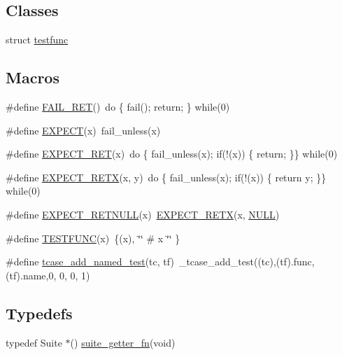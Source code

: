 \subsection*{Classes}
\begin{DoxyCompactItemize}
\item 
struct \hyperlink{structtestfunc}{testfunc}
\end{DoxyCompactItemize}
\subsection*{Macros}
\begin{DoxyCompactItemize}
\item 
\#define \hyperlink{openmote-cc2538_2lwip_2test_2unit_2lwip__check_8h_a6cdd9328a3d8ccf35c2044a2537ed188}{F\+A\+I\+L\+\_\+\+R\+ET}()~do \{ fail(); return; \} while(0)
\item 
\#define \hyperlink{openmote-cc2538_2lwip_2test_2unit_2lwip__check_8h_a8939fc832773dcf2c81b93d8bbf88603}{E\+X\+P\+E\+CT}(x)~fail\+\_\+unless(x)
\item 
\#define \hyperlink{openmote-cc2538_2lwip_2test_2unit_2lwip__check_8h_acf563e698c9e212be6e0506cc178964e}{E\+X\+P\+E\+C\+T\+\_\+\+R\+ET}(x)~do \{ fail\+\_\+unless(x); if(!(x)) \{ return; \}\} while(0)
\item 
\#define \hyperlink{openmote-cc2538_2lwip_2test_2unit_2lwip__check_8h_a61ba45af020516f53b9e9af7b066574e}{E\+X\+P\+E\+C\+T\+\_\+\+R\+E\+TX}(x,  y)~do \{ fail\+\_\+unless(x); if(!(x)) \{ return y; \}\} while(0)
\item 
\#define \hyperlink{openmote-cc2538_2lwip_2test_2unit_2lwip__check_8h_a937ec9da8ce7532d592ef5216e4173cd}{E\+X\+P\+E\+C\+T\+\_\+\+R\+E\+T\+N\+U\+LL}(x)~\hyperlink{openmote-cc2538_2lwip_2test_2unit_2lwip__check_8h_a61ba45af020516f53b9e9af7b066574e}{E\+X\+P\+E\+C\+T\+\_\+\+R\+E\+TX}(x, \hyperlink{openmote-cc2538_2lwip_2src_2include_2lwip_2def_8h_a070d2ce7b6bb7e5c05602aa8c308d0c4}{N\+U\+LL})
\item 
\#define \hyperlink{openmote-cc2538_2lwip_2test_2unit_2lwip__check_8h_ace3c4951143e45f20117e149d82f5a0b}{T\+E\+S\+T\+F\+U\+NC}(x)~\{(x), \char`\"{}\char`\"{} \# x \char`\"{}\char`\"{} \}
\item 
\#define \hyperlink{openmote-cc2538_2lwip_2test_2unit_2lwip__check_8h_a7bd4b6b9688f47b14fdc5b5ca6bd97fa}{tcase\+\_\+add\+\_\+named\+\_\+test}(tc,  tf)~\+\_\+tcase\+\_\+add\+\_\+test((tc),(tf).func,(tf).name,0, 0, 0, 1)
\end{DoxyCompactItemize}
\subsection*{Typedefs}
\begin{DoxyCompactItemize}
\item 
typedef Suite $\ast$() \hyperlink{openmote-cc2538_2lwip_2test_2unit_2lwip__check_8h_a97cc40c58ced9677a9ecfc759dd79aaf}{suite\+\_\+getter\+\_\+fn}(void)
\end{DoxyCompactItemize}
